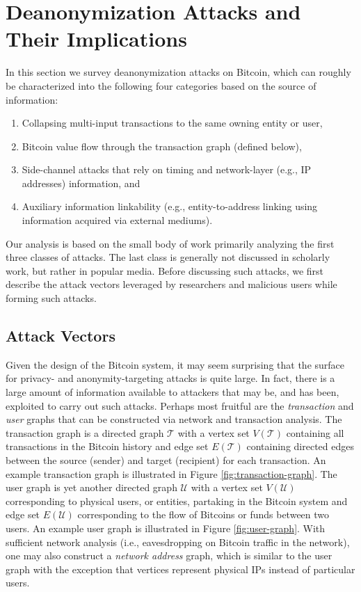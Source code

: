 \section{Deanonymization Attacks and Their Implications}
In this section we survey deanonymization attacks on Bitcoin, which can roughly be characterized into the following four categories based on the source of information:
\begin{enumerate}
	\item Collapsing multi-input transactions to the same owning entity or user,
	\item Bitcoin value flow through the transaction graph (defined below),
	\item Side-channel attacks that rely on timing and network-layer (e.g., IP addresses) information, and
	\item Auxiliary information linkability (e.g., entity-to-address linking using information acquired via external mediums).
\end{enumerate}
Our analysis is based on the small body of work primarily analyzing the first three classes of attacks. The last class is generally not discussed in scholarly work, but rather in popular media. Before discussing such attacks, we first describe the attack vectors leveraged by researchers and malicious users while forming such attacks.

\subsection{Attack Vectors} \label{sec:vectors}
Given the design of the Bitcoin system, it may seem surprising that the surface for privacy- and anonymity-targeting attacks is quite large. In fact, there is a large amount of information available to attackers that may be, and has been, exploited to carry out such attacks. Perhaps most fruitful are the \emph{transaction} and \emph{user} graphs that can be constructed via network and transaction analysis. The transaction graph is a directed graph $\mathcal{T}$ with a vertex set $V(\mathcal{T})$ containing all transactions in the Bitcoin history and edge set $E(\mathcal{T})$ containing directed edges between the source (sender) and target (recipient) for each transaction. An example transaction graph is illustrated in Figure \ref{fig:transaction-graph}. The user graph is yet another directed graph $\mathcal{U}$ with a vertex set $V(\mathcal{U})$ corresponding to physical users, or entities, partaking in the Bitcoin system and edge set $E(\mathcal{U})$ corresponding to the flow of Bitcoins or funds between two users. An example user graph is illustrated in Figure \ref{fig:user-graph}. With sufficient network analysis (i.e., eavesdropping on Bitcoin traffic in the network), one may also construct a \emph{network address} graph, which is similar to the user graph with the exception that vertices represent physical IPs instead of particular users. 


